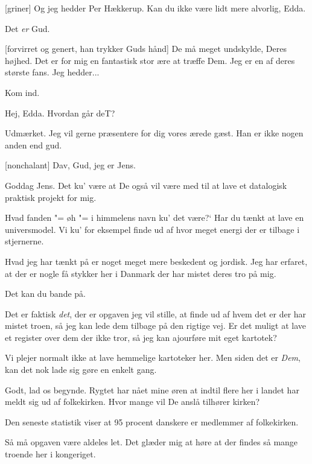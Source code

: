 \documentclass[a4paper,11pt]{article}
\begin{document}
\begin{sketch}
  [griner] Og jeg hedder Per Hækkerup.  Kan du ikke være lidt
  mere alvorlig, Edda.

   Det {\em er} Gud.

  [forvirret og genert, han trykker Guds hånd] De må meget
  undskylde, Deres højhed.  Det er for mig en fantastisk stor ære at
  træffe Dem.  Jeg er en af deres største fans.  Jeg hedder...


   Kom ind.


   Hej, Edda.  Hvordan går deT?

   Udmærket.  Jeg vil gerne præsentere for dig vores ærede
  gæst.  Han er ikke nogen anden end gud.

  [nonchalant] Dav, Gud, jeg er Jens.

   Goddag Jens.  Det ku' være at De også vil være med til at
  lave et datalogisk praktisk projekt for mig.

   Hvad fanden "= øh "= i himmelens navn ku' det være?` Har
  du tænkt at lave en universmodel.  Vi ku' for eksempel finde ud af
  hvor meget energi der er tilbage i stjernerne.

   Hvad jeg har tænkt på er noget meget mere beskedent og
  jordisk.  Jeg har erfaret, at der er nogle få stykker her i Danmark
  der har mistet deres tro på mig.

   Det kan du bande på.

   Det er faktisk {\em det}, der er opgaven jeg vil stille, at
  finde ud af hvem det er der har mistet troen, så jeg kan lede dem
  tilbage på den rigtige vej.  Er det muligt at lave et
  register over dem der ikke tror, så jeg kan ajourføre mit eget
  kartotek?

   Vi plejer normalt ikke at lave hemmelige kartoteker her.
  Men siden det er {\em Dem}, kan det nok lade sig gøre en enkelt
  gang.

   Godt, lad os begynde.  Rygtet har nået mine øren at indtil
  flere her i landet har meldt sig ud af folkekirken.  Hvor mange vil
  De anslå tilhører kirken?

   Den seneste statistik viser at 95 procent danskere er
  medlemmer af folkekirken.

   Så må opgaven være aldeles let.  Det glæder mig at høre at
  der findes så mange troende her i kongeriget.


\end{sketch}
\end{document}
